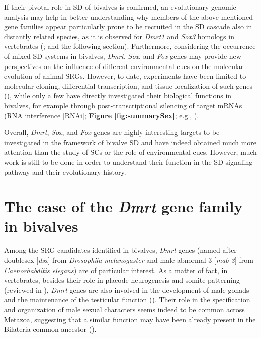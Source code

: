 \documentclass[../main.tex]{subfiles}
\begin{document}
If their pivotal role in SD of bivalves is confirmed, an evolutionary genomic analysis may help in better understanding why members of the above-mentioned gene families appear particularly prone to be recruited in the SD cascade also in distantly related species, as it is observed for \textit{Dmrt1} and \textit{Sox3} homologs in vertebrates (\textbf{\cite{marshall2010homologies,bachtrog2014sex}}; and the following section). Furthermore, considering the occurrence of mixed SD systems in bivalves, \textit{Dmrt}, \textit{Sox}, and \textit{Fox} genes may provide new perspectives on the influence of different environmental cues on the molecular evolution of animal SRGs. However, to date, experiments have been limited to molecular cloning, differential transcription, and tissue localization of such genes (\textbf{\cite{liang2019sox2,sun2022examination}}), while only a few have directly investigated their biological functions in bivalves, for example through post-transcriptional silencing of target mRNAs (RNA interference [RNAi]; \textbf{Figure \ref{fig:summarySex}}; e.g., \textbf{\cite{liang2019sox2,wang2020identification,sun2022examination}}).

Overall, \textit{Dmrt}, \textit{Sox}, and \textit{Fox} genes are highly interesting targets to be investigated in the framework of bivalve SD and have indeed obtained much more attention than the study of SCs or the role of environmental cues. However, much work is still to be done in order to understand their function in the SD signaling pathway and their evolutionary history.

\section{The case of the \textit{Dmrt} gene family in bivalves}

Among the SRG candidates identified in bivalves, \textit{Dmrt} genes (named after doublesex [\textit{dsx}] from \textit{Drosophila melanogaster} and male abnormal-3 [\textit{mab-3}] from \textit{Caenorhabditis elegans}) are of particular interest. As a matter of fact, in vertebrates, besides their role in placode neurogenesis and somite patterning (reviewed in \textbf{\cite{mawaribuchi2019independent}}), \textit{Dmrt} genes are also involved in the development of male gonads and the maintenance of the testicular function (\textbf{\cite{sun2022examination}}). Their role in the specification and organization of male sexual characters seems indeed to be common across Metazoa, suggesting that a similar function may have been already present in the Bilateria common ancestor (\textbf{\cite{kopp2012dmrt, beukeboom2014evolution}}).
\end{document}
